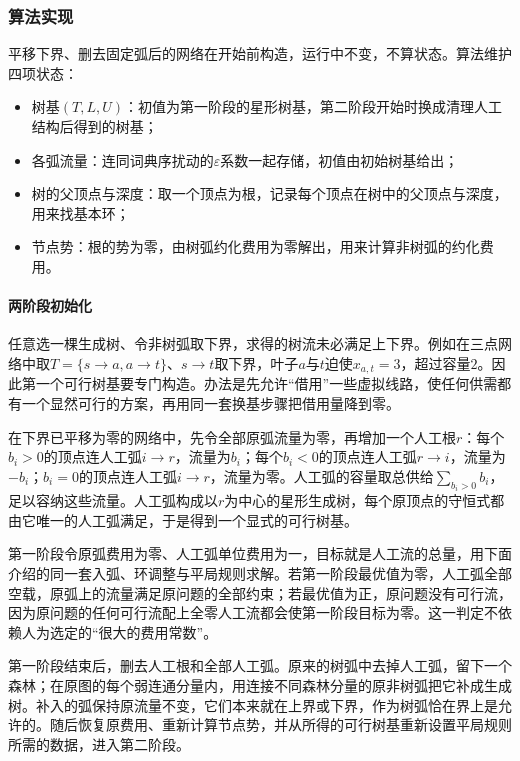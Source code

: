 \subsubsection{算法实现}

平移下界、删去固定弧后的网络在开始前构造，运行中不变，不算状态。算法维护四项状态：
\begin{itemize}
  \item 树基$(T,L,U)$：初值为第一阶段的星形树基，第二阶段开始时换成清理人工结构后得到的树基；
  \item 各弧流量：连同词典序扰动的$\varepsilon$系数一起存储，初值由初始树基给出；
  \item 树的父顶点与深度：取一个顶点为根，记录每个顶点在树中的父顶点与深度，用来找基本环；
  \item 节点势：根的势为零，由树弧约化费用为零解出，用来计算非树弧的约化费用。
\end{itemize}

\paragraph{两阶段初始化}
任意选一棵生成树、令非树弧取下界，求得的树流未必满足上下界。例如在三点网络中取$T=\{s\to a,a\to t\}$、$s\to t$取下界，叶子$a$与$t$迫使$x_{a,t}=3$，超过容量$2$。因此第一个可行树基要专门构造。办法是先允许“借用”一些虚拟线路，使任何供需都有一个显然可行的方案，再用同一套换基步骤把借用量降到零。

在下界已平移为零的网络中，先令全部原弧流量为零，再增加一个人工根$r$：每个$b_i>0$的顶点连人工弧$i\to r$，流量为$b_i$；每个$b_i<0$的顶点连人工弧$r\to i$，流量为$-b_i$；$b_i=0$的顶点连人工弧$i\to r$，流量为零。人工弧的容量取总供给$\sum_{b_i>0}b_i$，足以容纳这些流量。人工弧构成以$r$为中心的星形生成树，每个原顶点的守恒式都由它唯一的人工弧满足，于是得到一个显式的可行树基。

第一阶段令原弧费用为零、人工弧单位费用为一，目标就是人工流的总量，用下面介绍的同一套入弧、环调整与平局规则求解。若第一阶段最优值为零，人工弧全部空载，原弧上的流量满足原问题的全部约束；若最优值为正，原问题没有可行流，因为原问题的任何可行流配上全零人工流都会使第一阶段目标为零。这一判定不依赖人为选定的“很大的费用常数”。

第一阶段结束后，删去人工根和全部人工弧。原来的树弧中去掉人工弧，留下一个森林；在原图的每个弱连通分量内，用连接不同森林分量的原非树弧把它补成生成树。补入的弧保持原流量不变，它们本来就在上界或下界，作为树弧恰在界上是允许的。随后恢复原费用、重新计算节点势，并从所得的可行树基重新设置平局规则所需的数据，进入第二阶段。

